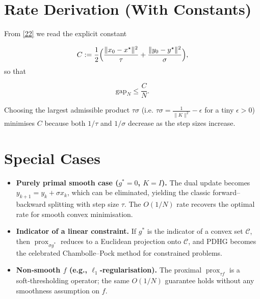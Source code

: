 \documentclass{article}
\newcommand{\prox}{\operatorname{prox}}
\begin{document}
\section*{Rate Derivation (With Constants)}
From \eqref{22} we read the explicit constant  

\[
C:=\frac{1}{2}\Bigl(\frac{\|x_{0}-x^{\star}\|^{2}}{\tau}
                     +\frac{\|y_{0}-y^{\star}\|^{2}}{\sigma}\Bigr),
\]
so that  

\[
\text{gap}_{N}\le \frac{C}{N}.
\tag{23}
\]

Choosing the largest admissible product $\tau\sigma$ (i.e. $\tau\sigma=\frac{1}{\|K\|^{2}}-\epsilon$ for a tiny $\epsilon>0$) minimises $C$ because both $1/\tau$ and $1/\sigma$ decrease as the step sizes increase.

\section*{Special Cases}
\begin{itemize}
  \item \textbf{Purely primal smooth case ($g^{*}=0$, $K=I$).} The dual update becomes $y_{k+1}=y_{k}+ \sigma x_{k}$, which can be eliminated, yielding the classic forward–backward splitting with step size $\tau$. The $O(1/N)$ rate recovers the optimal rate for smooth convex minimisation.
  \item \textbf{Indicator of a linear constraint.} If $g^{*}$ is the indicator of a convex set $\mathcal C$, then $\prox_{\sigma g^{*}}$ reduces to a Euclidean projection onto $\mathcal C$, and PDHG becomes the celebrated Chambolle–Pock method for constrained problems.
  \item \textbf{Non‑smooth $f$ (e.g., $\ell_{1}$‑regularisation).} The proximal $\prox_{\tau f}$ is a soft‑thresholding operator; the same $O(1/N)$ guarantee holds without any smoothness assumption on $f$.
\end{itemize}
\end{document}
